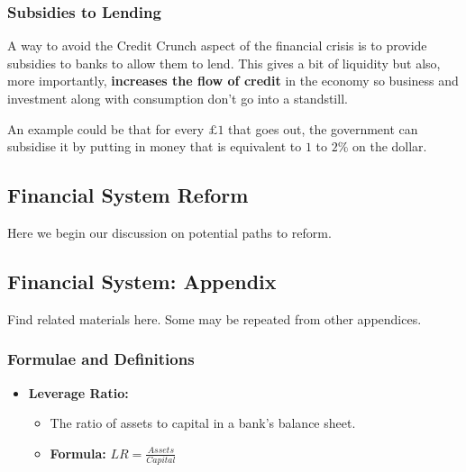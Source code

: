 \documentclass[12pt, letterpaper]{article}
\begin{document}
\subsubsection{Subsidies to Lending}
A way to avoid the Credit Crunch aspect of the financial crisis is to provide subsidies to banks to allow them to lend. This gives a bit of liquidity but also, more importantly, \textbf{increases the flow of credit} in the economy so business and investment along with consumption don't go into a standstill.

An example could be that for every $£1$ that goes out, the government can subsidise it by putting in money that is equivalent to $1$ to $2\%$ on the dollar.

\subsection{Financial System Reform}
Here we begin our discussion on potential paths to reform.

\subsection{Financial System: Appendix}
Find related materials here. Some may be repeated from other appendices.
\subsubsection{Formulae and Definitions}
\begin{itemize}
	\item \textbf{Leverage Ratio:}
		\begin{itemize}
			\item The ratio of assets to capital in a bank's balance sheet.
			\item \textbf{Formula:} $LR = \frac{Assets}{Capital}$
		\end{itemize}
\end{itemize}
\end{document}
